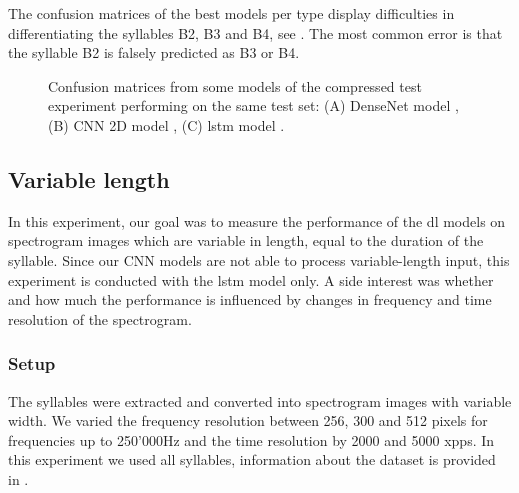 The confusion matrices of the best models per type display difficulties in differentiating the syllables B2, B3 and B4, see . The most common error is that the syllable B2 is falsely predicted as B3 or B4.

\begin{figure}[!htb]
  \centering
  \caption{Confusion matrices from some models of the compressed test experiment performing on the same test set: (A) DenseNet model \cite{nn_densNet_sct_compressed_nrs0_raw_100}, (B) CNN 2D model \cite{nn_cnn_2d_sct_compressed_nrs0_raw_100}, (C) \gls{lstm} model \cite{nn_lstm_sct_compressed_nrs0_hog_100}.}
  \label{fig:confusion_sct_compressed}
\end{figure}

\subsection{Variable length}
In this experiment, our goal was to measure the performance of the \gls{dl} models on spectrogram images which are variable in length, equal to the duration of the syllable. Since our CNN models are not able to process variable-length input, this experiment is conducted with the \gls{lstm} model only.
A side interest was whether and how much the performance is influenced by changes in frequency and time resolution of the spectrogram.

\subsubsection{Setup}\label{sec:variable_length_setup}
The syllables were extracted and converted into spectrogram images with variable width. We varied the frequency resolution between 256, 300 and 512 pixels for frequencies up to 250'000Hz and the time resolution by 2000 and 5000 \gls{xpps}.
In this experiment we used all syllables, information about the dataset is provided in .

